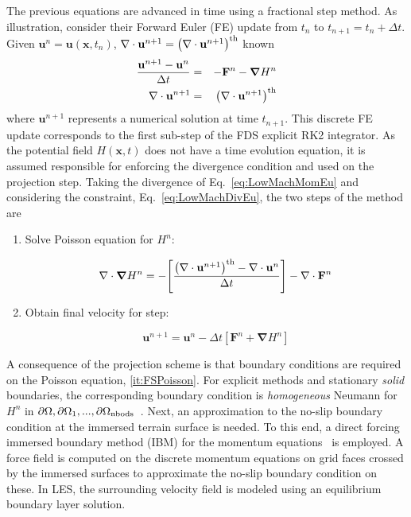\documentclass[journal,article,atmosphere,submit,moreauthors,pdftex]{Definitions/mdpi}
\begin{document}
The previous equations are advanced in time using a fractional step method. As illustration, consider their Forward Euler (FE) update from $t_n$ to $t_{n+1}=t_n + \Delta t$. Given $ \mathbf{u}^n=\mathbf{u}(\mathbf{x},t_n)$, $\nabla \cdot \mathbf{u}^{n+1} = \left( \nabla \cdot \mathbf{u}^{n+1} \right)^{\rm th}$ known
\begin{eqnarray}
  \frac{\mathbf{u}^{n+1}-\mathbf{u}^{n}}{\Delta t} &=& - \mathbf{F}^n -  \boldsymbol{\nabla} H^n \label{eq:LowMachMomEu}\\
  \nabla \cdot \mathbf{u}^{n+1} &=& \left( \nabla \cdot \mathbf{u}^{n+1} \right)^{\rm th} \label{eq:LowMachDivEu}
\end{eqnarray}
where $\mathbf{u}^{n+1}$ represents a numerical solution at time $t_{n+1}$. This discrete FE update corresponds to the first sub-step of the FDS explicit RK2 integrator. As the potential field $H(\mathbf{x},t)$ does not have a time evolution equation, it is assumed responsible for enforcing the divergence condition and used on the projection step. Taking the divergence of Eq.~\eqref{eq:LowMachMomEu} and considering  the constraint, Eq.~\eqref{eq:LowMachDivEu}, the two steps of the method are
\begin{enumerate}
  \item Solve Poisson equation for $H^n$:

\begin{equation}
   \nabla \cdot \boldsymbol{\nabla} H^n = - \left[ \frac{\left( \nabla \cdot \mathbf{u}^{n+1} \right)^{\rm th} - \nabla \cdot \mathbf{u}^{n}}{\Delta t} \right] - \nabla \cdot \mathbf{F}^n \label{it:FSPoisson}
\end{equation}

  \item Obtain final velocity for step:

  \begin{equation}
     \mathbf{u}^{n+1} = \mathbf{u}^{n} - \Delta t \left[ \mathbf{F}^n +  \boldsymbol{\nabla} H^n \right] \label{it:FSProject}
   \end{equation}

\end{enumerate}
A consequence of the projection scheme is that boundary conditions are required on the Poisson equation, \eqref{it:FSPoisson}. For explicit methods and stationary \textit{solid} boundaries, the corresponding boundary condition is \textit{homogeneous} Neumann for $H^n$ in $\partial \Omega,\partial \Omega_1,...,\partial \Omega_{\rm nbods}$~\cite{perot_1993}.
Next, an approximation to the no-slip boundary condition at the immersed terrain surface is needed. To this end, a direct forcing immersed boundary method (IBM) for the momentum equations~\cite{fadlun_2000} is employed. A force field is computed on the discrete momentum equations on grid faces crossed by the immersed surfaces to approximate the no-slip boundary condition on these. In LES, the surrounding velocity field is modeled using an equilibrium boundary layer solution.
\end{document}
